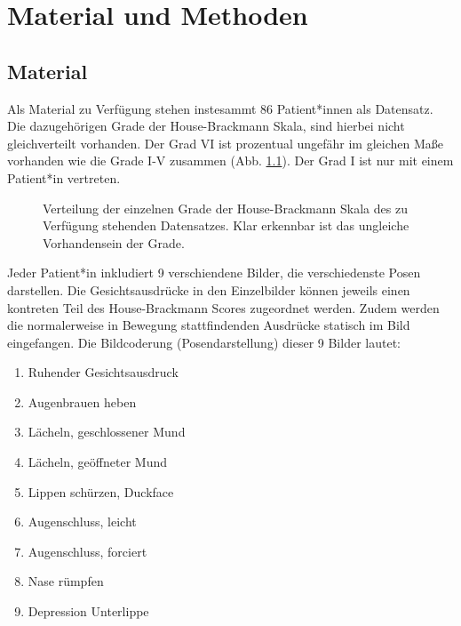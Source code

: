
\chapter{Material und Methoden}\label{method}


\section{Material}\label{material}
Als Material zu Verfügung stehen instesammt 86 Patient*innen als Datensatz. Die dazugehörigen Grade der House-Brackmann Skala, sind hierbei nicht gleichverteilt vorhanden. Der Grad VI ist prozentual ungefähr im gleichen Maße vorhanden wie die Grade I-V zusammen (Abb. \ref{cap:pie_grade}). Der Grad I ist nur mit einem Patient*in vertreten.

\begin{figure}[!b]\centering
{}
\caption[Verteilung der einzelnen Grade der House-Brackmann Skala]{Verteilung der einzelnen Grade der House-Brackmann Skala des zu Verfügung stehenden Datensatzes. Klar erkennbar ist das ungleiche Vorhandensein der Grade.}\label{cap:pie_grade}
\end{figure}\label{fig:pie_grade}


 Jeder Patient*in inkludiert 9 verschiendene Bilder, die verschiedenste Posen darstellen. Die Gesichtsausdrücke in den Einzelbilder können jeweils einen kontreten Teil des House-Brackmann Scores zugeordnet werden. Zudem werden die normalerweise in Bewegung stattfindenden Ausdrücke statisch im Bild eingefangen. Die Bildcoderung (Posendarstellung) dieser 9 Bilder lautet:

\begin{enumerate}
  \setlength\itemsep{-0.6em}
\item Ruhender Gesichtsausdruck
\item Augenbrauen heben
\item Lächeln, geschlossener Mund
\item Lächeln, geöffneter Mund
\item Lippen schürzen, \glqq Duckface\grqq{}
\item Augenschluss, leicht
\item Augenschluss, forciert
\item Nase rümpfen
\item Depression Unterlippe
\end{enumerate}

